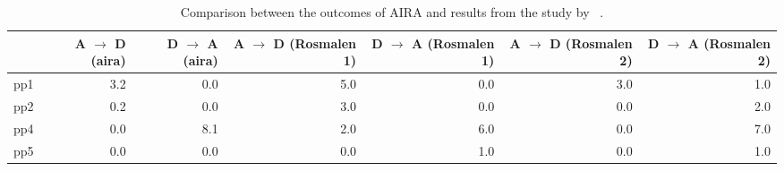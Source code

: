 \begin{table*}[ht]
\centering
\begin{tabular}{rrrrrrr}
  \toprule
 & A $\rightarrow$ D (aira) & D $\rightarrow$ A (aira) & A $\rightarrow$ D (Rosmalen 1) & D $\rightarrow$ A (Rosmalen 1) & A $\rightarrow$ D (Rosmalen 2) & D $\rightarrow$ A (Rosmalen 2) \\ 
  \midrule
pp1 & 3.2 & 0.0 & 5.0 & 0.0 & 3.0 & 1.0 \\ 
  pp2 & 0.2 & 0.0 & 3.0 & 0.0 & 0.0 & 2.0 \\ 
  pp4 & 0.0 & 8.1 & 2.0 & 6.0 & 0.0 & 7.0 \\ 
  pp5 & 0.0 & 0.0 & 0.0 & 1.0 & 0.0 & 1.0 \\ 
   \bottomrule
\end{tabular}
\caption{Comparison between the outcomes of AIRA and results from the study by \citeauthor{RefWorks:4}~\cite{RefWorks:4}.} 
\label{tab:comparison}
\end{table*}
